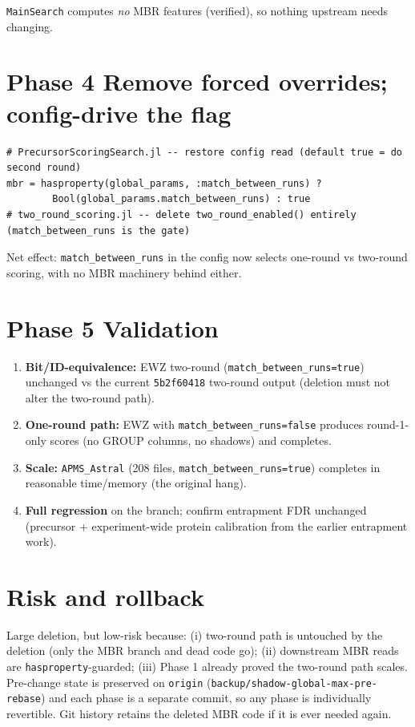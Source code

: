 \documentclass[10pt]{article}
\begin{document}
\texttt{MainSearch} computes \emph{no} MBR features (verified), so nothing upstream needs changing.

\section{Phase 4 \textemdash{} Remove forced overrides; config-drive the flag}

\begin{lstlisting}
# PrecursorScoringSearch.jl -- restore config read (default true = do second round)
mbr = hasproperty(global_params, :match_between_runs) ?
        Bool(global_params.match_between_runs) : true
# two_round_scoring.jl -- delete two_round_enabled() entirely (match_between_runs is the gate)
\end{lstlisting}

Net effect: \texttt{match\_between\_runs} in the config now selects one-round vs two-round scoring,
with no MBR machinery behind either.

\section{Phase 5 \textemdash{} Validation}

\begin{enumerate}[nosep,leftmargin=1.4em]
  \item \textbf{Bit/ID-equivalence:} EWZ two-round (\texttt{match\_between\_runs=true}) unchanged vs the
        current \texttt{5b2f60418} two-round output (deletion must not alter the two-round path).
  \item \textbf{One-round path:} EWZ with \texttt{match\_between\_runs=false} produces round-1-only
        scores (no GROUP columns, no shadows) and completes.
  \item \textbf{Scale:} \texttt{APMS\_Astral} (208 files, \texttt{match\_between\_runs=true}) completes in
        reasonable time/memory (the original hang).
  \item \textbf{Full regression} on the branch; confirm entrapment FDR unchanged (precursor +
        experiment-wide protein calibration from the earlier entrapment work).
\end{enumerate}

\section{Risk and rollback}

Large deletion, but low-risk because: (i) two-round path is untouched by the deletion (only the MBR
branch and dead code go); (ii) downstream MBR reads are \texttt{hasproperty}-guarded; (iii) Phase 1
already proved the two-round path scales. Pre-change state is preserved on \texttt{origin}
(\texttt{backup/shadow-global-max-pre-rebase}) and each phase is a separate commit, so any phase is
individually revertible. Git history retains the deleted MBR code if it is ever needed again.
\end{document}
